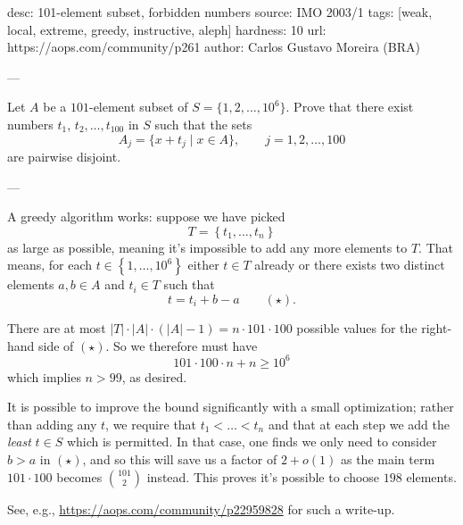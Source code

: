 desc:  101-element subset, forbidden numbers
source:  IMO 2003/1
tags:  [weak, local, extreme, greedy, instructive, aleph]
hardness: 10
url: https://aops.com/community/p261
author: Carlos Gustavo Moreira (BRA)

---

Let $A$ be a $101$-element subset of $S=\{1,2,\dots,10^6\}$.
Prove that there exist numbers $t_1$, $t_2, \dots, t_{100}$ in $S$ such that the sets
\[ A_j=\{x+t_j\mid x\in A\},\qquad j=1,2,\dots,100  \]
are pairwise disjoint.

---

A greedy algorithm works: suppose we have picked
\[ T = \left\{ t_1, \dots, t_n \right\} \]
as large as possible, meaning it's impossible to add any more elements to $T$.
That means, for each $t \in \left\{ 1, \dots, 10^6 \right\}$ either $t \in T$ already
or there exists two distinct elements $a, b \in A$ and $t_i \in T$ such that
\[ t = t_i + b - a \qquad (\star).  \]

There are at most
$|T| \cdot |A| \cdot \left( |A|-1 \right) = n \cdot 101 \cdot 100$
possible values for the right-hand side of $(\star)$.
So we therefore must have
\[ 101 \cdot 100 \cdot n + n \ge 10^6 \]
which implies $n > 99$, as desired.

\begin{remark*}
  It is possible to improve the bound significantly with a small optimization;
  rather than adding any $t$, we require that $t_1 < \dots < t_n$
  and that at each step we add the \emph{least} $t \in S$ which is permitted.
  In that case, one finds we only need to consider $b > a$ in $(\star)$,
  and so this will save us a factor of $2+o(1)$
  as the main term $101 \cdot 100$ becomes $\binom{101}{2}$ instead.
  This proves it's possible to choose $198$ elements.

  See, e.g., \url{https://aops.com/community/p22959828} for such a write-up.
\end{remark*}
